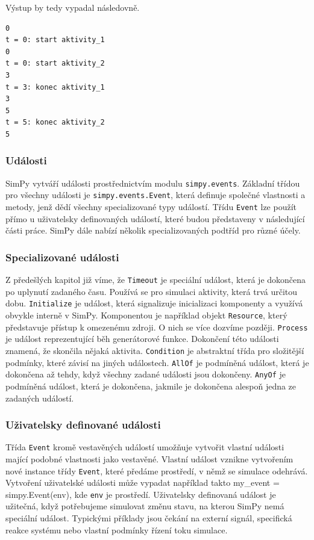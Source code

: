 \documentclass[
  program=itp,
  biblatex,
  figures=false,
  glossaries,
  index
]{kidiplom}
\begin{document}
\noindent Výstup by tedy vypadal následovně.

 \begin{verbatim} 
0
t = 0: start aktivity_1
0
t = 0: start aktivity_2
3
t = 3: konec aktivity_1
3
5
t = 5: konec aktivity_2
5
\end{verbatim}


\subsubsection{Události}
SimPy vytváří události prostřednictvím modulu \texttt{simpy.events}. Základní třídou pro všechny události je \texttt{simpy.events.Event}, která definuje společné vlastnosti a metody, jenž dědí všechny specializované typy událostí. Třídu \texttt{Event} lze použít přímo u uživatelsky definovaných událostí, které budou představeny v následující části práce. SimPy dále nabízí několik specializovaných podtříd pro různé účely.

\subsubsection{Specializované události}

Z předešlých kapitol již víme, že \texttt{Timeout} je speciální událost, která je dokončena po uplynutí zadaného času. Používá se pro simulaci aktivity, která trvá určitou dobu.
 \texttt{Initialize} je událost, která signalizuje inicializaci komponenty a využívá obvykle interně v SimPy. Komponentou je například objekt \texttt{Resource}, který představuje přístup k omezenému zdroji. O nich se více dozvíme později. \texttt{Process} je událost reprezentující běh generátorové funkce. Dokončení této události znamená, že skončila nějaká aktivita. \texttt{Condition} je abstraktní třída pro složitější podmínky, které závisí na jiných událostech. \texttt{AllOf} je podmíněná událost, která je dokončena až tehdy, když všechny zadané události jsou dokončeny. \texttt{AnyOf} je podmíněná událost, která je dokončena, jakmile je dokončena alespoň jedna ze zadaných událostí.

\subsubsection{Uživatelsky definované události}

Třída \texttt{Event} kromě vestavěných událostí umožňuje vytvořit vlastní události mající podobné vlastnosti jako vestavěné. Vlastní událost vznikne vytvořením nové instance třídy \texttt{Event}, které předáme prostředí, v němž se simulace odehrává. Vytvoření uživatelské události může vypadat například takto {my\_event = simpy.Event(env)}, kde \texttt{env} je prostředí. Uživatelsky definovaná událost je užitečná, když potřebujeme simulovat změnu stavu, na kterou SimPy nemá speciální událost. Typickými příklady jsou čekání na externí signál, specifická reakce systému nebo vlastní podmínky řízení toku simulace.
\end{document}
